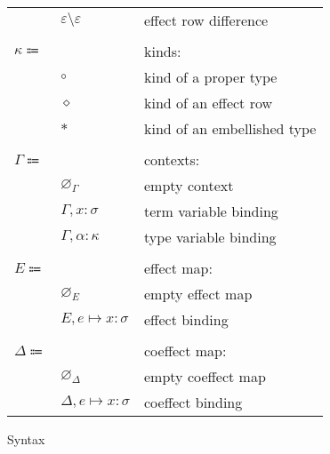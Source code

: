\documentclass[12pt]{article}
\newcommand\anno[2]{#1 : #2}
\newcommand\evar{x}
\newcommand\row{\varepsilon}
\newcommand\embellished{\sigma}
\newcommand\tvar{\alpha}
\newcommand\tdiff[2]{#1 \setminus #2}
\newcommand\kind{\kappa}
\newcommand\kproper{\circ}
\newcommand\krow{\diamond}
\newcommand\ktembellished{\ast}
\newcommand\context{\Gamma}
\newcommand\cempty{\varnothing_{\context}}
\newcommand\cextend[2]{#1, #2}
\newcommand\effect{e}
\newcommand\effectmap{E}
\newcommand\coeffectmap{\Delta}
\newcommand\emempty{\varnothing_{\effectmap}}
\newcommand\ecomempty{\varnothing_{\coeffectmap}}
\newcommand\emmap[2]{#1 \mapsto #2}
\newcommand\emextend[2]{#1, #2}
\begin{document}
\begin{figure}[H]
\begin{mdframed}[backgroundcolor=none]
\begin{center}
\begin{tabular}{l l l}
              & $\tdiff{\row}{\row}$ & effect row difference \\
              \\
              $\kind \Coloneqq$ & & kinds: \\
              & $\kproper$ & kind of a proper type \\
              & $\krow$ & kind of an effect row \\
              & $\ktembellished$ & kind of an embellished type \\
              \\
              $\context \Coloneqq$ & & contexts: \\
              & $\cempty$ & empty context \\
              & $\cextend{\context}{\anno{\evar}{\embellished}}$ & term variable binding \\
              & $\cextend{\context}{\anno{\tvar}{\kind}}$ & type variable binding \\
              \\
              $\effectmap \Coloneqq$ & & effect map: \\
              & $\emempty$ & empty effect map \\
              & $\emextend{\effectmap}{\emmap{\effect}{\anno{\evar}{\embellished}}}$ & effect binding \\
              \\
              $\coeffectmap \Coloneqq$ & & coeffect map: \\
              & $\ecomempty$ & empty coeffect map \\
              & $\emextend{\coeffectmap}{\emmap{\effect}{\anno{\evar}{\embellished}}}$ & coeffect binding \\
            \end{tabular}
          \end{center}

          \caption{Syntax}\label{fig:syntax}
        \end{mdframed}
      \end{figure}
\end{document}
